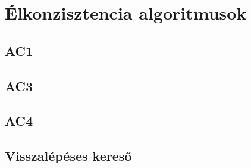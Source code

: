 \section{Élkonzisztencia algoritmusok}

\subsection{AC1}

\subsection{AC3}

\subsection{AC4}

\subsection{Visszalépéses kereső}
